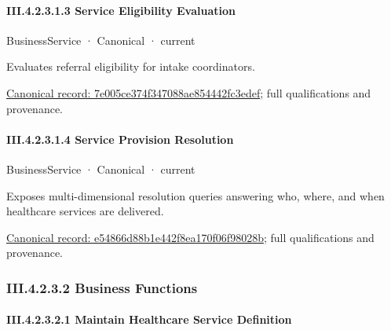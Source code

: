 \paragraph*{III.4.2.3.1.3 Service Eligibility Evaluation}
\label{navigation:III.4.2.3.1.3}

\label{element:7e005ce374f347088ae854442fc3edef}
{\small BusinessService · Canonical · current}\par

Evaluates referral eligibility for intake coordinators.


{\footnotesize \href{../../../../../../../continuum/business/business-service/7e005ce374f347088ae854442fc3edef.md}{Canonical record: 7e005ce374f347088ae854442fc3edef}; full qualifications and provenance.}\par
\paragraph*{III.4.2.3.1.4 Service Provision Resolution}
\label{navigation:III.4.2.3.1.4}

\label{element:e54866d88b1e442f8ea170f06f98028b}
{\small BusinessService · Canonical · current}\par

Exposes multi-dimensional resolution queries answering who, where, and when healthcare services are delivered.


{\footnotesize \href{../../../../../../../continuum/business/business-service/e54866d88b1e442f8ea170f06f98028b.md}{Canonical record: e54866d88b1e442f8ea170f06f98028b}; full qualifications and provenance.}\par
\subsubsection*{III.4.2.3.2 Business Functions}
\label{navigation:III.4.2.3.2}

\paragraph*{III.4.2.3.2.1 Maintain Healthcare Service Definition}
\label{navigation:III.4.2.3.2.1}

